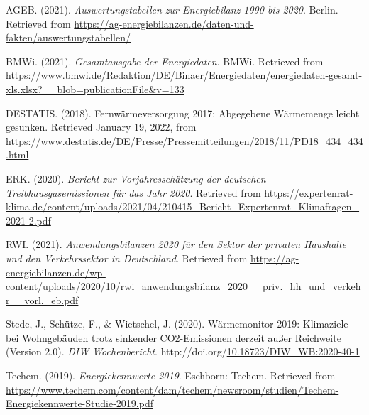 \documentclass[12pt,twoside]{reedthesis}
\newlength{\cslhangindent}
\newenvironment{CSLReferences}[2] %
 {%
  \setlength{\parindent}{0pt}
  \ifodd #1 \everypar{\setlength{\hangindent}{\cslhangindent}}\ignorespaces\fi
  \ifnum #2 > 0
  \setlength{\parskip}{#2\baselineskip}
  \fi
 }%
 {}
\begin{document}
\hypertarget{refs}{}
\begin{CSLReferences}{1}{0}
\leavevmode{}%
AGEB. (2021). \emph{Auswertungstabellen zur Energiebilanz 1990 bis 2020}. Berlin. Retrieved from \url{https://ag-energiebilanzen.de/daten-und-fakten/auswertungstabellen/}

\leavevmode{}%
BMWi. (2021). \emph{Gesamtausgabe der Energiedaten}. BMWi. Retrieved from \url{https://www.bmwi.de/Redaktion/DE/Binaer/Energiedaten/energiedaten-gesamt-xls.xlsx?__blob=publicationFile\&v=133}

\leavevmode{}%
DESTATIS. (2018). Fernwärmeversorgung 2017: Abgegebene Wärmemenge leicht gesunken. Retrieved January 19, 2022, from \url{https://www.destatis.de/DE/Presse/Pressemitteilungen/2018/11/PD18_434_434.html}

\leavevmode{}%
ERK. (2020). \emph{Bericht zur Vorjahresschätzung der deutschen Treibhausgasemissionen für das Jahr 2020}. Retrieved from \url{https://expertenrat-klima.de/content/uploads/2021/04/210415_Bericht_Expertenrat_Klimafragen_2021-2.pdf}

\leavevmode{}%
RWI. (2021). \emph{Anwendungsbilanzen 2020 für den Sektor der privaten Haushalte und den Verkehrssektor in Deutschland}. Retrieved from \url{https://ag-energiebilanzen.de/wp-content/uploads/2020/10/rwi_anwendungsbilanz_2020__priv._hh_und_verkehr__vorl._eb.pdf}

\leavevmode{}%
Stede, J., Schütze, F., \& Wietschel, J. (2020). Wärmemonitor 2019: Klimaziele bei Wohngebäuden trotz sinkender CO2-Emissionen derzeit außer Reichweite (Version 2.0). \emph{DIW Wochenbericht}. http://doi.org/\href{https://doi.org/10.18723/DIW_WB:2020-40-1}{10.18723/DIW\_WB:2020-40-1}

\leavevmode{}%
Techem. (2019). \emph{Energiekennwerte 2019}. Eschborn: Techem. Retrieved from \url{https://www.techem.com/content/dam/techem/newsroom/studien/Techem-Energiekennwerte-Studie-2019.pdf}

\end{CSLReferences}

\end{document}
